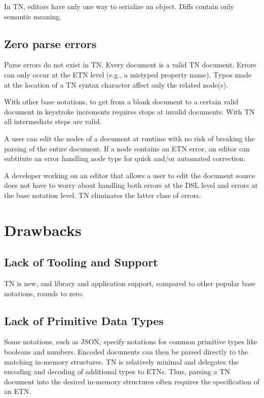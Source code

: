 \documentclass[journal]{IEEEtran}
\begin{document}
In TN, editors have only one way to serialize an object. Diffs contain only semantic meaning.

\subsection{Zero parse errors}

Parse errors do not exist in TN. Every document is a valid TN document. Errors can only occur at the ETN level (e.g., a mistyped property name). Typos made at the location of a TN syntax character affect only the related node(s).

With other base notations, to get from a blank document to a certain valid document in keystroke increments requires stops at invalid documents. With TN all intermediate steps are valid.

A user can edit the nodes of a document at runtime with no risk of breaking the parsing of the entire document. If a node contains an ETN error, an editor can subtitute an error handling node type for quick and/or automated correction.

A developer working on an editor that allows a user to edit the document source does not have to worry about handling both errors at the DSL level and errors at the base notation level. TN eliminates the latter class of errors.

\section{Drawbacks}

\subsection{Lack of Tooling and Support}

TN is new, and library and application support, compared to other popular base notations, rounds to zero.

\subsection{Lack of Primitive Data Types}

Some notations, such as JSON, specify notations for common primitive types like booleans and numbers. Encoded documents can then be parsed directly to the matching in-memory structures. TN is relatively minimal and delegates the encoding and decoding of additional types to ETNs. Thus, parsing a TN document into the desired in-memory structures often requires the specification of an ETN.
\end{document}
